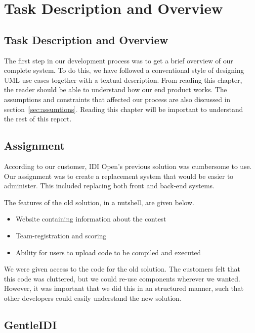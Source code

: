 \chapter{Task Description and Overview}

\section{Task Description and Overview}
\label{sec:taskdesc}

The first step in our development process was to get a brief overview of
our complete system. To do this, we have followed a conventional style
of designing UML use cases together with a textual description. From
reading this chapter, the reader should be able to understand how our
end product works. The assumptions and constraints that affected our 
process are also discussed in section~\ref{sec:assumtions}. 
Reading this chapter will be important to
understand the rest of this report.  

\section{Assignment}
According to our customer, IDI Open's previous solution was
cumbersome to use. Our assignment was to create a replacement system
that would be easier to administer.
This included replacing both front and back-end systems.

The features of the old solution, in a nutshell, are given below.
\begin{itemize}
\item Website containing information about the contest
\item Team-registration and scoring
\item Ability for users to upload code to be compiled and executed
\end{itemize}

We were given access to the code for the old solution. The customers
felt that this code was cluttered, but we could re-use components
wherever we wanted. However, it was important that we did this in an
structured manner, such that other developers could easily understand the
new solution.

\section{GentleIDI}

